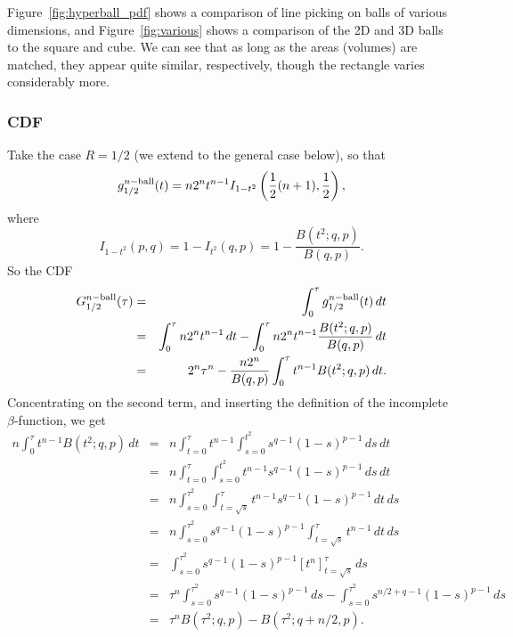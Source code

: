 Figure~\ref{fig:hyperball_pdf} shows a comparison of line picking on
balls of various dimensions, and Figure~\ref{fig:various} shows a
comparison of the 2D and 3D balls to the square and cube. We can see
that as long as the areas (volumes) are matched, they appear quite
similar, respectively, though the rectangle varies considerably more.

\subsubsection{CDF}

Take the case $R=1/2$ (we extend to the general case below), so that
\begin{equation}
 g^{n-{\rm ball}}_{1/2}(t) = n 2^n t^{n-1} I_{1-t^2}\left( 
  \frac{1}{2} (n+1), \frac{1}{2}
                      \right),
\end{equation}
where
\begin{equation}
   I_{1-t^2}(p,q) = 1 - I_{t^2}(q,p) = 1 - \frac{ B(t^2; q,p)}{B(q,p)}.
\end{equation}
So the CDF
\begin{eqnarray}
   G^{n-{\rm ball}}_{1/2}(\tau)
       & = & \int_0^\tau g^{n-{\rm ball}}_{1/2}(t) \, dt \nonumber \\
       & = &  \int_0^\tau n 2^n t^{n-1} \, dt 
            - \int_0^\tau n 2^n t^{n-1}  \frac{ B(t^2; q,p)}{B(q,p)} \, dt 
                  \nonumber \\
       & = &  2^n \tau^{n} 
            - \frac{n 2^n}{B(q,p)} \int_0^\tau t^{n-1}   B(t^2; q,p) \, dt .
\end{eqnarray}
Concentrating on the second term, and inserting the definition of the
incomplete $\beta$-function, we get 
\begin{eqnarray}
  n \int_0^\tau t^{n-1}  B(t^2; q,p) \, dt
       & = & n \int_{t=0}^\tau t^{n-1}  \int_{s=0}^{t^2} s^{q-1} (1 - s)^{p-1} \, ds \, dt \nonumber \\
       & = & n \int_{t=0}^\tau \int_{s=0}^{t^2} t^{n-1}  s^{q-1} (1 - s)^{p-1} \, ds \, dt \nonumber \\
       & = & n \int_{s=0}^{\tau^2} \int_{t=\sqrt{s}}^\tau t^{n-1}  s^{q-1} (1 - s)^{p-1} \, dt  \, ds \nonumber \\
       & = & n \int_{s=0}^{\tau^2}  s^{q-1} (1 - s)^{p-1} \int_{t=\sqrt{s}}^\tau t^{n-1} \, dt  \, ds \nonumber \\
       & = & \int_{s=0}^{\tau^2}  s^{q-1} (1 - s)^{p-1} \left[ t^{n} \right]_{t=\sqrt{s}}^\tau  \, ds \nonumber \\
       & = & \tau^n \int_{s=0}^{\tau^2}  s^{q-1} (1 - s)^{p-1} \, ds -
              \int_{s=0}^{\tau^2}  s^{n/2+q-1} (1 - s)^{p-1} \, ds \nonumber \\
       & = & \tau^n B(\tau^2; q,p) -  B(\tau^2; q+n/2,p).
\end{eqnarray}
